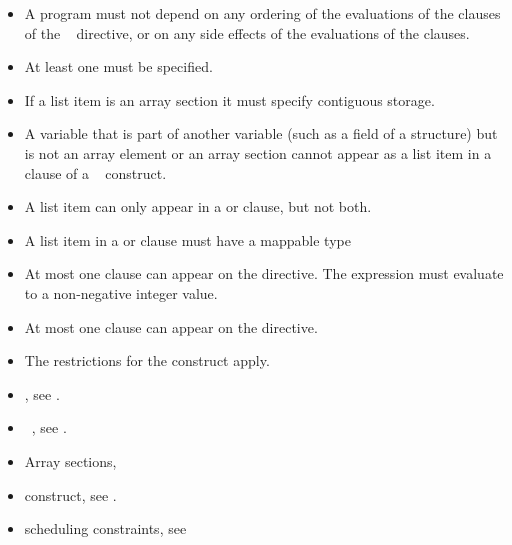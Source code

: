 \restrictions
\begin{itemize}
\item A program must not depend on any ordering of the evaluations of the clauses of the 
~ directive, or on any side effects of the evaluations of the clauses. 

\item At least one  must be specified.

\item If a list item is an array section it must specify contiguous storage. 

\item A variable that is part of another variable (such as a field of a structure) but is not an 
array element or an array section cannot appear as a list item in a clause of a 
~ construct. 

\item A list item can only appear in a  or  clause, but not both.

\item A list item in a  or  clause must have a mappable type

\item At most one  clause can appear on the directive. The  expression 
must evaluate to a non-negative integer value.

\item At most one  clause can appear on the directive. 

\item The restrictions for the  construct apply. 
\end{itemize}

\crossreferences
\begin{itemize}
\item {}, see 
.

\item {}~, see 
. 

\item Array sections, 

\item {} construct, see 
.

\item {} scheduling constraints, see 


\end{itemize}











